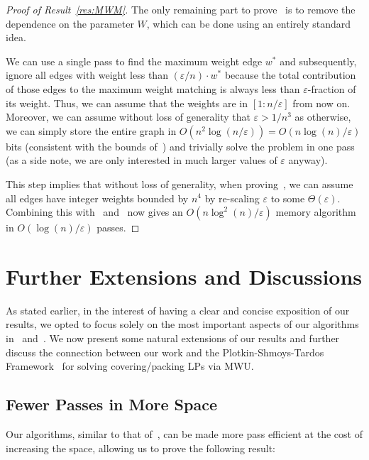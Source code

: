 \documentclass{article}
\newcommand{\eps}{\varepsilon}
\begin{document}
\begin{proof}[Proof of Result~\ref{res:MWM}]
The only remaining part to prove~ is to remove the dependence on the parameter $W$, which can be done using an entirely standard idea.  

We can use a single pass to find the maximum weight edge $w^*$ and subsequently, ignore all edges with weight less than $(\eps/n) \cdot w^*$ because the total contribution of those edges to the maximum weight matching
is always less than $\eps$-fraction of its weight.  Thus, we can assume that the weights are in $[1: n/\eps]$ from now on.  
Moreover, we can assume without loss of generality that $\eps > 1/n^3$ as otherwise, we can simply store the entire graph in $O(n^2\log{(n/\eps)}) = O(n\log{\!(n)}/\eps)$ bits (consistent with the bounds of~) and 
trivially solve the problem in one pass (as a side note, we are only interested in much larger values of $\eps$ anyway). 

This step implies that without loss of generality, when proving~, we can assume all edges have integer weights bounded by  $n^{4}$ by re-scaling $\eps$ to some $\Theta(\eps)$. 
Combining this with~ and~ 
now gives an $O(n\log^2\!{(n)}/\eps)$ memory algorithm in $O(\log{\!(n)}/\eps)$ passes. 
\end{proof}


\section{Further Extensions and Discussions}\label{sec:extensions}

As stated earlier, in the interest of having a clear and concise exposition of our results, we opted to focus solely on the most important aspects of our algorithms in~ and~. We now
 present some natural extensions of our results and further discuss the connection between our work and the Plotkin-Shmoys-Tardos Framework~\cite{PlotkinST91} for solving covering/packing LPs via MWU. 


\subsection{Fewer Passes in More Space}\label{sec:ext-few-pass}

Our algorithms, similar to that of~\cite{AhnG15}, can be made more pass efficient at the cost of increasing the space, allowing us to prove the following result: 
\end{document}
